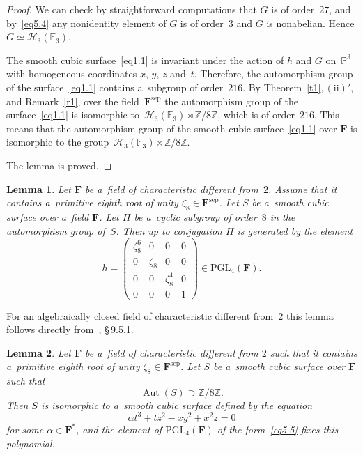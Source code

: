 \documentclass{amsart}
\numberwithin{equation}{section}
\theoremstyle{plain}
\newtheorem{lemma}{Lemma}
\theoremstyle{definition}
\theoremstyle{remark}
\begin{document}
\begin{proof}
We can check by straightforward computations that $G$ is of order~$27$, and by~\eqref{eq5.4} any nonidentity element of $G$ is of order~$3$ and $G$ is nonabelian. Hence $G \simeq \mathcal{H}_3(\mathbb{F}_3)$.

The smooth cubic surface~\eqref{eq1.1} is invariant under the action of $h$ and $G$ on~$\mathbb{P}^3$ with homogeneous coordinates $x$, $y$, $z$ and~$t$. Therefore, the automorphism group of the surface~\eqref{eq1.1} contains a~subgroup of order~$216$. By Theorem~\ref{t1},\,$(\mathrm{ii})'$, and Remark~\ref{r1}, over the field~$\mathbf{F}^{\mathrm{sep}}$ the automorphism group of the surface~\eqref{eq1.1} is isomorphic to~$\mathcal{H}_3(\mathbb{F}_3) \rtimes \mathbb{Z}/8\mathbb{Z}$, which is of order~$216$. This means that the automorphism group of the smooth cubic surface~\eqref{eq1.1} over $\mathbf{F}$ is isomorphic to the group~$\mathcal{H}_3(\mathbb{F}_3) \rtimes \mathbb{Z}/8\mathbb{Z}$.

The lemma is proved.
\end{proof}

\goodbreak

\begin{lemma}
\label{l29}
Let $\mathbf{F}$ be a~field of characteristic different from~$2$. Assume that it contains a~primitive eighth root of unity $\zeta_8 \in \mathbf{F}^{\mathrm{sep}}$. Let $S$ be a~smooth cubic surface over a~field $\mathbf{F}$. Let $H$ be a~cyclic subgroup of order~$8$ in the automorphism group of~$S$. Then up to conjugation $H$ is generated by the element
\begin{equation}
\label{eq5.5}
h=\begin{pmatrix}
\zeta_8^6 & 0 & 0 & 0\\
0 & \zeta_8 & 0 & 0\\
0 & 0 & \zeta_8^4 & 0\\
0 & 0 & 0 & 1
\end{pmatrix} \in \mathrm{PGL}_4(\mathbf{F}).
\end{equation}
\end{lemma}

For an algebraically closed field of characteristic different from~$2$ this lemma follows directly from~\cite{7}, \S\,9.5.1.

\begin{lemma}
\label{l30}
Let $\mathbf{F}$ be a~field of characteristic different from $2$ such that it contains a~primitive eighth root of unity $\zeta_8 \in \mathbf{F}^{\mathrm{sep}}$. Let $S$ be a~smooth cubic surface over $\mathbf{F}$ such that
$$
\operatorname{Aut}(S) \supset \mathbb{Z}/8\mathbb{Z}.
$$
Then $S$ is isomorphic to a~smooth cubic surface defined by the equation
\begin{equation}
\label{eq5.6}
\alpha t^3+tz^2-xy^2+x^2z=0
\end{equation}
for some $\alpha \!\in\! \mathbf{F}^*$, and the element of $\mathrm{PGL}_4(\mathbf{F})$ of the form~\eqref{eq5.5} fixes this \mbox{polynomial}.
\end{lemma}
\end{document}
